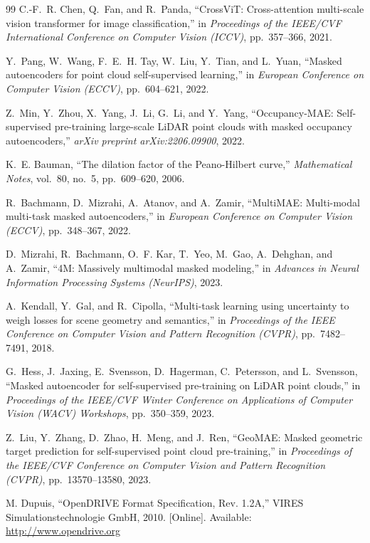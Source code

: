 \documentclass{book}
\begin{document}
\begin{thebibliography}{99}
C.-F.~R. Chen, Q.~Fan, and R.~Panda, ``CrossViT: Cross-attention multi-scale vision transformer for image classification,'' in \textit{Proceedings of the IEEE/CVF International Conference on Computer Vision (ICCV)}, pp.~357--366, 2021.
 
Y.~Pang, W.~Wang, F.~E.~H. Tay, W.~Liu, Y.~Tian, and L.~Yuan, ``Masked autoencoders for point cloud self-supervised learning,'' in \textit{European Conference on Computer Vision (ECCV)}, pp.~604--621, 2022.
 
Z.~Min, Y.~Zhou, X.~Yang, J.~Li, G.~Li, and Y.~Yang, ``Occupancy-MAE: Self-supervised pre-training large-scale LiDAR point clouds with masked occupancy autoencoders,'' \textit{arXiv preprint arXiv:2206.09900}, 2022.
 
K.~E. Bauman, ``The dilation factor of the Peano-Hilbert curve,'' \textit{Mathematical Notes}, vol.~80, no.~5, pp.~609--620, 2006.
 
R.~Bachmann, D.~Mizrahi, A.~Atanov, and A.~Zamir, ``MultiMAE: Multi-modal multi-task masked autoencoders,'' in \textit{European Conference on Computer Vision (ECCV)}, pp.~348--367, 2022.
 
D.~Mizrahi, R.~Bachmann, O.~F. Kar, T.~Yeo, M.~Gao, A.~Dehghan, and A.~Zamir, ``4M: Massively multimodal masked modeling,'' in \textit{Advances in Neural Information Processing Systems (NeurIPS)}, 2023.
 
A.~Kendall, Y.~Gal, and R.~Cipolla, ``Multi-task learning using uncertainty to weigh losses for scene geometry and semantics,'' in \textit{Proceedings of the IEEE Conference on Computer Vision and Pattern Recognition (CVPR)}, pp.~7482--7491, 2018.
 
G.~Hess, J.~Jaxing, E.~Svensson, D.~Hagerman, C.~Petersson, and L.~Svensson, ``Masked autoencoder for self-supervised pre-training on LiDAR point clouds,'' in \textit{Proceedings of the IEEE/CVF Winter Conference on Applications of Computer Vision (WACV) Workshops}, pp.~350--359, 2023.
 
Z.~Liu, Y.~Zhang, D.~Zhao, H.~Meng, and J.~Ren, ``GeoMAE: Masked geometric target prediction for self-supervised point cloud pre-training,'' in \textit{Proceedings of the IEEE/CVF Conference on Computer Vision and Pattern Recognition (CVPR)}, pp.~13570--13580, 2023.

M. Dupuis, ``OpenDRIVE Format Specification, Rev. 1.2A,'' VIRES Simulationstechnologie GmbH, 2010. [Online]. Available: \url{http://www.opendrive.org}


\end{thebibliography}
\end{document}

